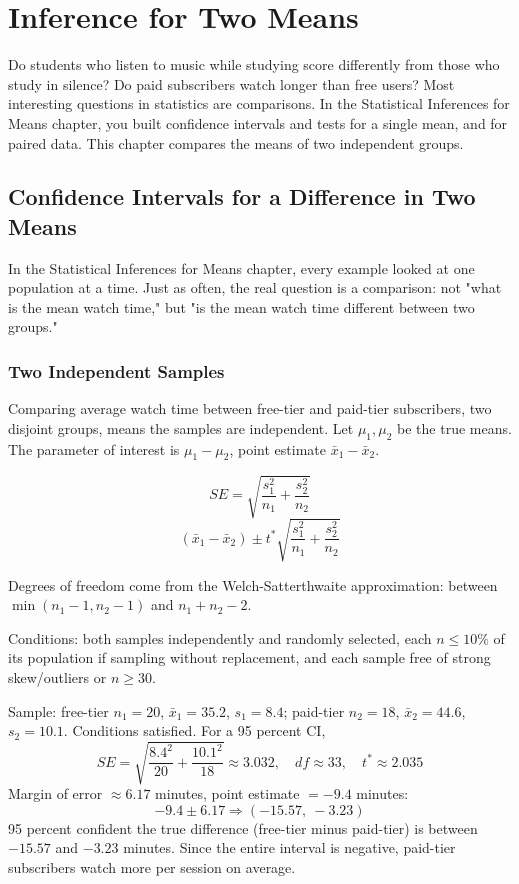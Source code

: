 \chapter{Inference for Two Means}

Do students who listen to music while studying score differently from those who study in silence? Do paid
subscribers watch longer than free users? Most interesting questions in statistics are comparisons. In the
Statistical Inferences for Means chapter, you built confidence intervals and tests for a single mean, and for
paired data. This chapter compares the means of two independent groups.

\section{Confidence Intervals for a Difference in Two Means}

In the Statistical Inferences for Means chapter, every example looked at one population at a time. Just as often, the real question is a comparison: not "what is the mean watch time," but "is the mean watch time different between two groups."

\subsection{Two Independent Samples}

Comparing average watch time between free-tier and paid-tier subscribers, two disjoint groups, means the samples are independent. Let $\mu_1, \mu_2$ be the true means. The parameter of interest is $\mu_1 - \mu_2$, point estimate $\bar{x}_1 - \bar{x}_2$.

\[
SE = \sqrt{\dfrac{s_1^2}{n_1} + \dfrac{s_2^2}{n_2}}
\]
\[
(\bar{x}_1 - \bar{x}_2) \pm t^* \sqrt{\dfrac{s_1^2}{n_1} + \dfrac{s_2^2}{n_2}}
\]

Degrees of freedom come from the Welch-Satterthwaite approximation: between $\min(n_1-1, n_2-1)$ and $n_1+n_2-2$.

Conditions: both samples independently and randomly selected, each $n \leq 10\%$ of its population if sampling without replacement, and each sample free of strong skew/outliers or $n \geq 30$.

Sample: free-tier $n_1 = 20$, $\bar{x}_1 = 35.2$, $s_1 = 8.4$; paid-tier $n_2 = 18$, $\bar{x}_2 = 44.6$, $s_2 = 10.1$. Conditions satisfied. For a 95 percent CI,
\[
SE = \sqrt{\dfrac{8.4^2}{20} + \dfrac{10.1^2}{18}} \approx 3.032, \quad df \approx 33, \quad t^* \approx 2.035
\]
Margin of error $\approx 6.17$ minutes, point estimate $= -9.4$ minutes:
\[
-9.4 \pm 6.17 \Rightarrow (-15.57,\ -3.23)
\]
95 percent confident the true difference (free-tier minus paid-tier) is between $-15.57$ and $-3.23$ minutes. Since the entire interval is negative, paid-tier subscribers watch more per session on average.


